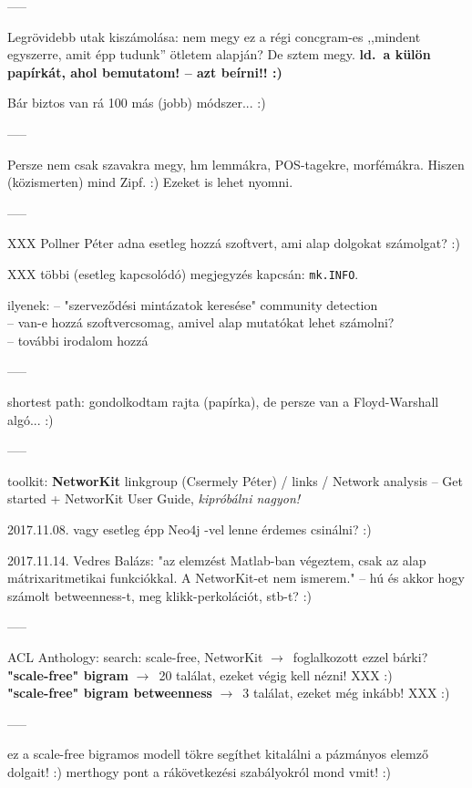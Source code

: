 \documentclass{llncs}
\newcommand{\nyil}{$\rightarrow$\ }
\newcommand{\embf}[1]{\textbf{#1}}
\begin{document}
-----

Legrövidebb utak kiszámolása:
nem megy ez a régi concgram-es ,,mindent egyszerre, amit épp tudunk''
ötletem alapján? De sztem megy.
\embf{ld.\ a külön papírkát, ahol bemutatom! -- azt beírni!! :)}

Bár biztos van rá 100 más (jobb) módszer... :)

-----

Persze nem csak szavakra megy, hm lemmákra, POS-tagekre, morfémákra.
Hiszen (közismerten) mind Zipf. :) Ezeket is lehet nyomni.

-----

XXX Pollner Péter adna esetleg hozzá szoftvert,
ami alap dolgokat számolgat? :)

XXX többi (esetleg kapcsolódó) megjegyzés 
\cite{kovacs2012magyar} kapcsán: {\tt mk.INFO}.

ilyenek:
-- "szerveződési mintázatok keresése" community detection\\
-- van-e hozzá szoftvercsomag, amivel alap mutatókat lehet számolni?\\
-- további irodalom hozzá

-----

shortest path: gondolkodtam rajta (papírka),
de persze van a Floyd-Warshall algó... :)

-----

toolkit: \embf{NetworKit}
linkgroup (Csermely Péter) / links / Network analysis
-- Get started + NetworKit User Guide, \emph{kipróbálni nagyon!}

2017.11.08. vagy esetleg épp Neo4j -vel lenne érdemes csinálni? :)

2017.11.14. Vedres Balázs: "az elemzést Matlab-ban végeztem,
csak az alap mátrixaritmetikai funkciókkal. A NetworKit-et nem ismerem."
-- hú és akkor hogy számolt betweenness-t, meg klikk-perkolációt, stb-t? :)


-----

ACL Anthology: search: scale-free, NetworKit
\nyil foglalkozott ezzel bárki?\\
\embf{"scale-free" bigram} \nyil 20 találat, ezeket végig kell nézni! XXX :)\\
\embf{"scale-free" bigram betweenness} \nyil 3 találat, ezeket még inkább! XXX :)

-----

ez a scale-free bigramos modell tökre segíthet kitalálni a pázmányos
elemző dolgait! :) merthogy pont a rákövetkezési szabályokról mond vmit! :)
\end{document}

